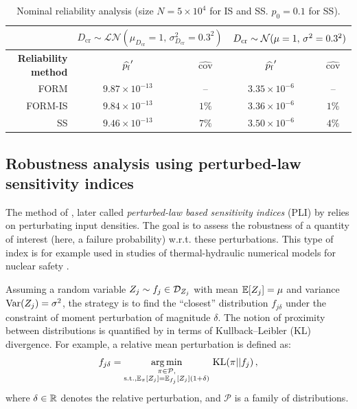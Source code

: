 \begin{table}[h]
    \centering
    \caption{Nominal reliability analysis (size $N=5 \times 10^4$ for IS and SS. $p_0=0.1$ for SS).}
    \begin{tabular}{r||c|c|c|c}
              &  \multicolumn{2}{c|}{$D_{\mathrm{cr}} \sim \mathcal{LN}(\mu_{D_{\mathrm{cr}}}=1, \, \sigma^2_{D_{\mathrm{cr}}}=0.3^2)$} & \multicolumn{2}{c}{$D_{\mathrm{cr}} \sim \mathcal{N}(\mu=1, \, \sigma^2=0.3^2)$}\\
    \hline
    \bf Reliability method & $\widehat{p_\mathrm{f}}'$       & $\widehat{\mathrm{cov}}$    & $\widehat{p_\mathrm{f}}'$       & $\widehat{\mathrm{cov}}$ \\
    \hline\hline
    FORM      & $9.87 \times 10^{-13}$ & --                    & $3.35 \times 10^{-6}$ & --\\
    \hline
    FORM-IS   & $9.84 \times 10^{-13}$ & $1 \%$                & $3.36 \times 10^{-6}$ & $1 \%$\\
    \hline
    SS        & $9.46 \times 10^{-13}$ & $7 \%$               & $3.50 \times 10^{-6}$ & $4 \%$\\ 
    \end{tabular}
    \label{tab:pf_result_table}
\end{table}


\subsection{Robustness analysis using perturbed-law sensitivity indices}\label{sec:owt_robustness}
The method of \citet{lemaitre_2015_PLI}, later called \textit{perturbed-law based sensitivity indices} (PLI) by \citet{sueur_2017_PLI} relies on perturbating input densities. 
The goal is to assess the robustness of a quantity of interest (here, a failure probability) w.r.t. these perturbations. 
This type of index is for example used in studies of thermal-hydraulic numerical models for nuclear safety \citep{iooss_2022_pli}. 

Assuming a random variable $Z_j \sim f_j \in \mathcal{D}_{Z_j}$ with mean $\mathbb{E}[Z_j]=\mu$ and variance $\operatorname{Var}(Z_j) = \sigma^2$, the strategy is to find the ``closest'' distribution $f_{j \delta}$ under the constraint of moment perturbation of magnitude $\delta$.  
The notion of proximity between distributions is quantified by \citet{lemaitre_2015_PLI} in terms of Kullback–Leibler (KL) divergence. 
For example, a relative mean perturbation is defined as: 
\begin{eqnarray}
    f_{j \delta} = \operatorname*{arg\,min}_{\substack{\pi\in \mathcal{P}, \\ \mathrm{s.t.}, \mathbb{E}_\pi[Z_j] = \mathbb{E}_{f_j}[Z_j](1 + \delta)}} \, \mathrm{KL}(\pi||f_j)\, , 
\end{eqnarray} 
where $\delta \in \mathbb{R}$ denotes the relative perturbation, and $\mathcal{P}$ is a family of distributions. 


